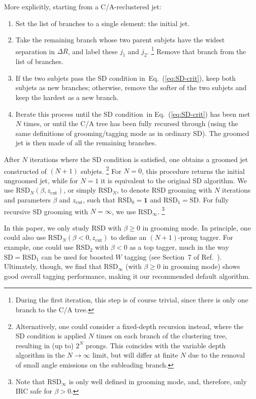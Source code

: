 \documentclass[11pt,a4paper]{article}
\newcommand{\zcut}{z_\text{cut}}
\newcommand{\RSDN}{\text{RSD}_N}
\newcommand{\RSDNarg}{\text{RSD}_N(\beta,\zcut)}
\DeclareRobustCommand{\Eq}[1]{Eq.~(\ref{#1})}
\DeclareRobustCommand{\Ref}[1]{Ref.~\cite{#1}}
\begin{document}
More explicitly, starting from a C/A-reclustered jet:
%
\begin{enumerate}
\item Set the list of branches to a single element: the initial jet.
\item Take the remaining branch whose two parent subjets have the
  widest separation in $\Delta R$, and label these $j_1$ and $j_2$.%
  \footnote{During the first iteration, this step is of course trivial,
    since there is only one branch to the C/A tree.}
  Remove that branch from the list of branches.
\item If the two subjets pass the SD condition in~\Eq{eq:SD-crit},
  keep both subjets as new branches; otherwise, remove the softer of
  the two subjets and keep the hardest as a new branch.  
\item Iterate this process until the SD
  condition~in \Eq{eq:SD-crit} has been met $N$ times, or until the
   C/A tree has been fully recursed through (using the same
   definitions of grooming/tagging mode as in ordinary SD).
   The groomed jet is then made of all the remaining branches.
\end{enumerate}
%
After $N$ iterations where the SD condition is satisfied, one
obtains a groomed jet constructed of $(N+1)$ subjets.%
\footnote{Alternatively, one could consider a fixed-depth recursion
  instead, where the SD condition is applied $N$ times on each branch
  of the clustering tree, resulting in (up to) $2^N$ prongs. This coincides with the variable depth algorithm in the $N\rightarrow \infty$ limit, but will differ at finite $N$ due to the removal of small angle emissions on the subleading branch.}
%
For $N=0$, this procedure returns the initial ungroomed jet, while
for $N=1$ it is equivalent to the original SD algorithm.
%
We use $\RSDNarg$, or simply $\RSDN$, to denote
RSD grooming with $N$ iterations and parameters $\beta$ and $\zcut$, such
that $\text{RSD}_0 = \mathbf{1}$ and $\text{RSD}_1 = \text{SD}$.
%
For fully recursive SD grooming with $N=\infty$, we use RSD$_\infty$.%
%
\footnote{Note that RSD$_\infty$ is only well defined in grooming
  mode, and, therefore, only IRC safe for $\beta>0$.}

In this paper, we only study RSD with $\beta \ge 0$ in grooming mode.
%
In principle, one could also use $\RSDN(\beta<0,\zcut)$ to define an
$(N+1)$-prong tagger.
%
For example, one could use RSD$_2$ with $\beta<0$ as a top tagger,
much in the way $\text{SD} = \text{RSD}_1$ can be used for boosted $W$
tagging (see Section~7 of \Ref{Larkoski:2014wba}). 
%
Ultimately, though, we find that RSD$_\infty$ (with $\beta \ge 0$ in grooming mode) shows good overall tagging performance, making it our recommended default algorithm.
  
\end{document}
